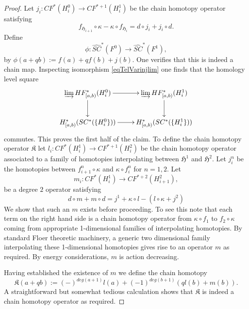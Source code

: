 \documentclass[11pt]{amsart}
\newtheorem{lm}[tm]{Lemma}
\theoremstyle{definition}
\theoremstyle{remark}
\begin{document}
\begin{proof}
Let $j_i:CF^*(H_i^0)\to CF^{*+1}(H_i^1)$ be the chain homotopy operator satisfying
\[
f_{\mathfrak{H}_{i+1}}\circ \kappa-\kappa\circ f_{\mathfrak{H}_i}=d\circ j_i+j_i\circ d.
\]
Define
\[
\phi:\widehat{SC}^*(F^0)\to\widehat{SC}^*(F^1),
\]
by $\phi(a+qb):=f(a)+qf(b)+j(b)$. One verifies that this is indeed a chain map. Inspecting isomorphism \eqref{eqTelVarinjlim} one finds that the homology level square
\[
\xymatrix{
\varinjlim HF^*_{[a,b)}(H^0_i)\ar[d]\ar[r]&\varinjlim HF^*_{[a,b)}(H^1_i)\ar[d] \\
H^*_{[a,b)}(SC^*(\{H^0_i\})) \ar[r] &H^*_{[a,b)}(SC^*(\{H^1_i\}))
}
\]
commutes. This proves the first half of the claim. To define the chain homotopy operator $\mathfrak{K}$ let $l_i: CF^*(H^1_i)\to CF^{*+1}(H^2_i)$ be the chain homotopy operator associated to a family of homotopies interpolating between $\mathfrak{H}^1$ and $\mathfrak{H}^2$. Let $j^n_i$ be the homotopies between $f_{i+1}^n\circ\kappa$ and $\kappa\circ f_i^n$ for $n=1,2$. Let
\[
m_i:CF^*(H^1_i)\to CF^{*+2}(H^2_{i+1}),
\]
be a degree $2$ operator satisfying
\[
d\circ m+m\circ d=j^1+\kappa\circ l-(l\circ\kappa+j^2)
\]
We show that such an $m$ exists before proceeding. To see this note that each term on the right hand side is a chain homotopy operator from $\kappa\circ f_1$ to $f_2\circ\kappa$ coming from appropriate 1-dimensional families of interpolating homotopies. By standard Floer theoretic machinery, a generic two dimensional family interpolating these 1-dimensional homotopies gives rise to an operator $m$ as required. By energy considerations, $m$ is action decreasing.

Having established the existence of $m$ we define the chain homotopy
\[
\mathfrak{K}(a+qb):=(-)^{deg(a+1)}l(a)+(-1)^{deg(b+1)}(ql(b)+m(b)).
\]
A straightforward but somewhat tedious calculation shows that $\mathfrak{K}$ is indeed a chain homotopy operator as required.
\end{proof}

\end{document}
